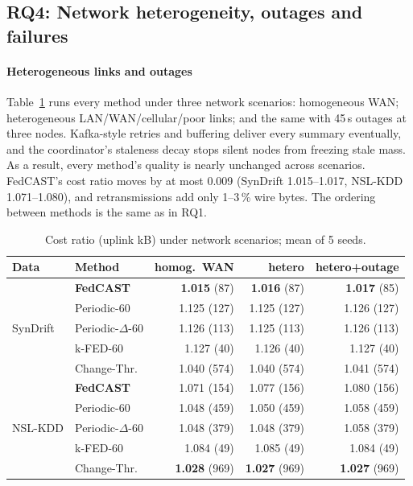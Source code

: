 \subsection{RQ4: Network heterogeneity, outages and failures}\label{sec:rq4}

\paragraph{Heterogeneous links and outages} Table~\ref{tab:net} runs every method under three network scenarios: homogeneous WAN; heterogeneous LAN/WAN/cellular/poor links; and the same with 45\,s outages at three nodes. Kafka-style retries and buffering deliver every summary eventually, and the coordinator's staleness decay stops silent nodes from freezing stale mass. As a result, every method's quality is nearly unchanged across scenarios. FedCAST's cost ratio moves by at most 0.009 (SynDrift 1.015--1.017, NSL-KDD 1.071--1.080), and retransmissions add only 1--3\,\% wire bytes. The ordering between methods is the same as in RQ1.

\begin{table}[t]
\centering\small
\caption{Cost ratio (uplink kB) under network scenarios; mean of 5 seeds.}\label{tab:net}
\setlength{\tabcolsep}{2.5pt}
\begin{tabular}{@{}llrrr@{}}
\toprule
Data & Method & homog.\ WAN & hetero & hetero+outage\\
\midrule
\multirow{5}{*}{SynDrift} & \textbf{FedCAST} & \textbf{1.015} (87) & \textbf{1.016} (87) & \textbf{1.017} (85)\\
 & Periodic-60 & 1.125 (127) & 1.125 (127) & 1.126 (127)\\
 & Periodic-$\Delta$-60 & 1.126 (113) & 1.125 (113) & 1.126 (113)\\
 & k-FED-60 & 1.127 (40) & 1.126 (40) & 1.127 (40)\\
 & Change-Thr. & 1.040 (574) & 1.040 (574) & 1.041 (574)\\
\midrule
\multirow{5}{*}{NSL-KDD} & \textbf{FedCAST} & 1.071 (154) & 1.077 (156) & 1.080 (156)\\
 & Periodic-60 & 1.048 (459) & 1.050 (459) & 1.058 (459)\\
 & Periodic-$\Delta$-60 & 1.048 (379) & 1.048 (379) & 1.058 (379)\\
 & k-FED-60 & 1.084 (49) & 1.085 (49) & 1.084 (49)\\
 & Change-Thr. & \textbf{1.028} (969) & \textbf{1.027} (969) & \textbf{1.027} (969)\\
\bottomrule
\end{tabular}
\end{table}

